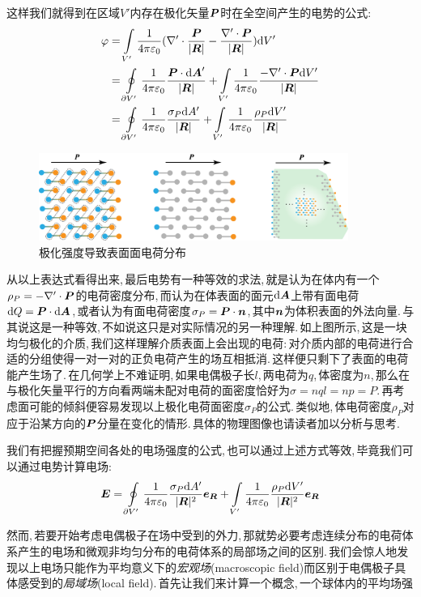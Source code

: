 这样我们就得到在区域$V'$内存在极化矢量$\boldsymbol{P}$时在全空间产生的电势的公式:
\begin{align*}
\varphi 	&=\int\limits_{V'}\frac{1}{4\pi\varepsilon_0} (\nabla'\cdot\frac{\boldsymbol{P}}{|\boldsymbol{R}|}-\frac{\nabla'\cdot \boldsymbol{P}}{|\boldsymbol{R}|})\textrm{d} V'\\
			&=\oint\limits_{\partial V'} \frac{1}{4\pi\varepsilon_0} \frac{\boldsymbol{P}\cdot\textrm{d} \boldsymbol{A}'}{|\boldsymbol{R}|}+\int\limits_{V'}\frac{1}{4\pi\varepsilon_0}\frac{-\nabla'\cdot \boldsymbol{P} \textrm{d} V'}{|\boldsymbol{R}|}\\
			&=\oint\limits_{\partial V'} \frac{1}{4\pi\varepsilon_0} \frac{\sigma_P\textrm{d} A'}{|\boldsymbol{R}|}+\int\limits_{V'}\frac{1}{4\pi\varepsilon_0}\frac{\rho_P \textrm{d} V'}{|\boldsymbol{R}|}
\end{align*}

\begin{figure}[H]
\centering
\includegraphics[width=0.9\textwidth]{image/7-1-16.png}
\caption{极化强度导致表面面电荷分布}
\end{figure}

从以上表达式看得出来,\,最后电势有一种等效的求法,\,就是认为在体内有一个$\rho_P=-\nabla'\cdot\boldsymbol{P}$的电荷密度分布,\,而认为在体表面的面元$\textrm{d} \boldsymbol{A}$上带有面电荷$\textrm{d} Q=\boldsymbol{P}\cdot\textrm{d} \boldsymbol{A}$,\,或者认为有面电荷密度$\sigma_P=\boldsymbol{P}\cdot\boldsymbol{n}$,\,其中$\boldsymbol{n}$为体积表面的外法向量.\,与其说这是一种等效,\,不如说这只是对实际情况的另一种理解.\,如上图所示,\,这是一块均匀极化的介质,\,我们这样理解介质表面上会出现的电荷:\,对介质内部的电荷进行合适的分组使得一对一对的正负电荷产生的场互相抵消.\,这样便只剩下了表面的电荷能产生场了.\,在几何学上不难证明,\,如果电偶极子长$l$,\,两电荷为$q$,\,体密度为$n$,\,那么在与极化矢量平行的方向看两端未配对电荷的面密度恰好为$\sigma=nql=np=P$.\,再考虑面可能的倾斜便容易发现以上极化电荷面密度$\sigma_P$的公式.\,类似地,\,体电荷密度$\rho_P$对应于沿某方向的$\boldsymbol{P}$分量在变化的情形.\,具体的物理图像也请读者加以分析与思考.

我们有把握预期空间各处的电场强度的公式,\,也可以通过上述方式等效,\,毕竟我们可以通过电势计算电场:
\[\boldsymbol{E}=\oint\limits_{\partial V'} \frac{1}{4\pi\varepsilon_0} \frac{\sigma_P\textrm{d} A'}{|\boldsymbol{R}|^2}\boldsymbol{e}_{\boldsymbol{R}}+\int\limits_{V'}\frac{1}{4\pi\varepsilon_0}\frac{\rho_P \textrm{d} V'}{|\boldsymbol{R}|^2}\boldsymbol{e}_{\boldsymbol{R}}\]

然而,\,若要开始考虑电偶极子在场中受到的外力,\,那就势必要考虑连续分布的电荷体系产生的电场和微观非均匀分布的电荷体系的局部场之间的区别.\,我们会惊人地发现以上电场只能作为平均意义下的\emph{宏观场}(macroscopic field)而区别于电偶极子具体感受到的\emph{局域场}(local field).\,首先让我们来计算一个概念,\,一个球体内的平均场强